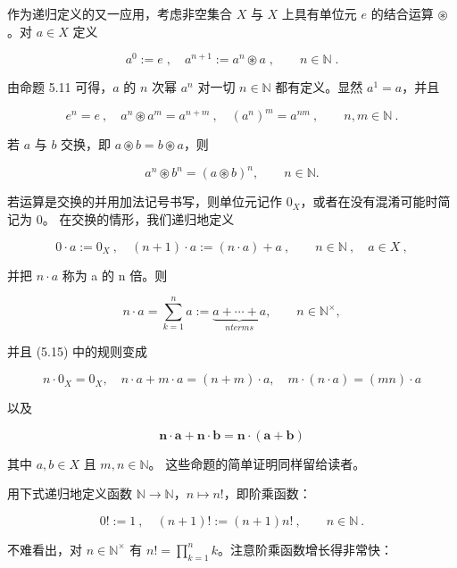 \begin{example}

\begin{items}
\item

作为递归定义的又一应用，考虑非空集合 $ X $ 与 $ X $ 上具有单位元 $ e $ 的结合运算 $ \circledast $。对 $ a \in X $ 定义

\begin{equation}
a^{0}:=e\;,\quad a^{n+1}:=a^{n}\circledast a\;,\qquad n\in\mathbb{N}\;.
\end{equation}

由命题 5.11 可得，$ a $ 的 $ n $ 次幂 $ a^n $ 对一切 $ n \in \mathbb{N} $ 都有定义。显然 $ a^1 = a $，并且

\[
e^{n}=e~,\quad a^{n}\circledast a^{m}=a^{n+m}~,\quad(a^{n})^{m}=a^{n m}~,\qquad n,m\in\mathbb{N}~.
\]

若 $a$ 与 $b$ 交换，即 $a\circledast b = b\circledast a$，则

\[
a^{n}\circledast b^{n}=(a\circledast b)^{n},\qquad n\in\mathbb{N}.
\]

若运算是交换的并用加法记号书写，则单位元记作 $ 0_X $，或者在没有混淆可能时简记为 0。
在交换的情形，我们递归地定义

\[
0\cdot a:=0_{X}~,\quad(n+1)\cdot a:=(n\cdot a)+a~,\qquad n\in\mathbb{N}~,\quad a\in X~,
\]

并把 $ n \cdot a $ 称为 a 的 n 倍。则

\[
n\cdot a=\sum_{k=1}^{n}a:=\underbrace{a+\cdots+a}_{n terms},\qquad n\in\mathbb{N}^{\times},
\]

并且 (5.15) 中的规则变成

\[
n\cdot0_{X}=0_{X},\quad n\cdot a+m\cdot a=(n+m)\cdot a,\quad m\cdot(n\cdot a)=(mn)\cdot a
\]

以及

\[
\boldsymbol{n}\cdot\boldsymbol{a}+\boldsymbol{n}\cdot\boldsymbol{b}=\boldsymbol{n}\cdot(\boldsymbol{a}+\boldsymbol{b})
\]

其中 $ a, b \in X $ 且 $ m, n \in \mathbb{N} $。
这些命题的简单证明同样留给读者。

\item

用下式递归地定义函数 $ \mathbb{N} \to \mathbb{N} $，$ n \mapsto n! $，即阶乘函数：

\[
0!:=1~,\quad(n+1)!:=(n+1)n!~,\qquad n\in\mathbb{N}~.
\]

不难看出，对 $ n \in \mathbb{N}^\times $ 有 $ n! = \prod_{k=1}^{n} k $。注意阶乘函数增长得非常快：


\end{items}
\end{example}
